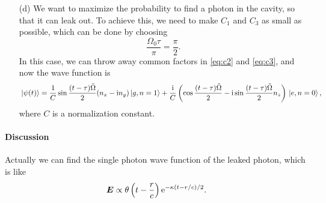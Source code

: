 \documentclass[hyperref, a4paper]{article}
\newcommand*{\ii}{\mathrm{i}}
\newcommand*{\ee}{\mathrm{e}}
\begin{document}
\begin{itemize}
\item[(d)] We want to maximize the probability to find a photon in the cavity, so that it can leak out.
To achieve this, we need to make $C_1$ and $C_3$ as small as possible, which can be done by choosing 
\begin{equation}
    \frac{\Omega_0 \tau}{\pi} = \frac{\pi}{2}.
\end{equation}
In this case, we can throw away common factors in \eqref{eq:c2} and \eqref{eq:c3}, and now the wave function 
is 
\begin{equation}
    \ket*{\psi(t)} = \frac{1}{C} \sin \frac{(t - \tau) \tilde{\Omega}}{2} (n_x - \ii n_y) \ket*{g, n=1} + \frac{\ii}{C} \left( \cos \frac{(t - \tau) \tilde{\Omega}}{2} - \ii \sin \frac{(t - \tau) \tilde{\Omega}}{2} n_z \right) \ket*{e, n=0},
\end{equation}
where $C$ is a normalization constant. 

\end{itemize}

\paragraph{Discussion} Actually we can find the single photon wave function of the leaked photon, which is like 
\begin{equation}
    \vb*{E} \propto \theta\left(t - \frac{r}{c}\right) \ee^{- \kappa(t - r / c) / 2}.
\end{equation}
\end{document}
